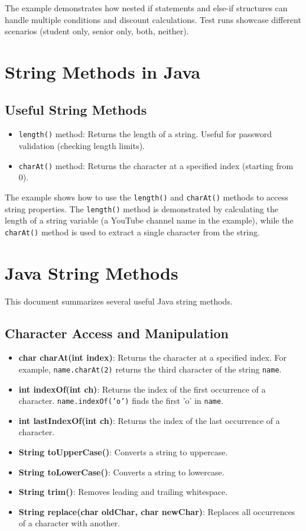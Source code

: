 \documentclass{article}
\begin{document}
The example demonstrates how nested if statements and else-if structures can handle multiple conditions and discount calculations.  Test runs showcase different scenarios (student only, senior only, both, neither).


\section{String Methods in Java}

\subsection{Useful String Methods}

\begin{itemize}
    \item \texttt{length()} method: Returns the length of a string.  Useful for password validation (checking length limits).
    \item \texttt{charAt()} method: Returns the character at a specified index (starting from 0).
\end{itemize}

The example shows how to use the \texttt{length()} and \texttt{charAt()} methods to access string properties.  The \texttt{length()} method is demonstrated by calculating the length of a string variable (a YouTube channel name in the example), while the \texttt{charAt()} method is used to extract a single character from the string.


\section{Java String Methods}

This document summarizes several useful Java string methods.

\subsection{Character Access and Manipulation}

\begin{itemize}
    \item \textbf{char charAt(int index)}: Returns the character at a specified index.  For example,  \texttt{name.charAt(2)} returns the third character of the string \texttt{name}.
    \item \textbf{int indexOf(int ch)}: Returns the index of the first occurrence of a character.  \texttt{name.indexOf('o')} finds the first 'o' in \texttt{name}.
    \item \textbf{int lastIndexOf(int ch)}: Returns the index of the last occurrence of a character.
    \item \textbf{String toUpperCase()}: Converts a string to uppercase.
    \item \textbf{String toLowerCase()}: Converts a string to lowercase.
    \item \textbf{String trim()}: Removes leading and trailing whitespace.
    \item \textbf{String replace(char oldChar, char newChar)}: Replaces all occurrences of a character with another.
\end{itemize}
\end{document}
